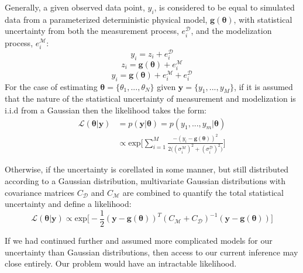 Generally, a given observed data point, $y_i$, is considered to be equal to simulated data from a parameterized deterministic physical model, $\bm{g}(\bm{\theta})$, with statistical uncertainty from both the measurement process, $e^{\mathcal{D}}_i$, and the modelization process, $e^{\mathcal{M}}_i$:
\begin{equation}
y_i = z_i + e^{\mathcal{D}}_i
\end{equation}
\begin{equation}
z_i = \bm{g}(\bm{\theta}) + e^{\mathcal{M}}_i
\end{equation}
\begin{equation}
y_i = \bm{g}(\bm{\theta}) + e^{\mathcal{M}}_i + e^{\mathcal{D}}_i
\end{equation}
For the case of estimating $\bm{\theta} = \{\theta_1,...,\theta_N\}$ given $\bm{y} = \{y_1,...,y_M\}$, if it is assumed that the nature of the statistical uncertainty of measurement and modelization is i.i.d from a Gaussian then the likelihood takes the form: 
\begin{equation}
\begin{split}
\mathcal{L}(\bm{\theta}|\bm{y}) &= p(\bm{y}|\bm{\theta}) = p(y_1,...,y_m|\bm{\theta})\\
&\propto  \text{exp}\bigg[\sum_{i = 1}^{M}\frac{-(y_i-\bm{g}({\bm{\theta}}))^2}{2\big((\sigma^{\mathcal{M}}_i)^2+(\sigma^{\mathcal{D}}_i)^2\big)}\bigg]
\end{split}
\label{likelihood-1}
\end{equation}



Otherwise, if the uncertainty is corellated in some manner, but still distributed according to a Gaussian distribution, multivariate Gaussian distributions with covariance matrices $C_{\mathcal{D}}$ and $C_{\mathcal{M}}$ are combined to quantify the total statistical uncertainty and define a likelihood:
\begin{equation}
\mathcal{L}(\bm{\theta}|\bm{y}) \propto \text{exp}\bigg[-\frac{1}{2}(\bm{y}-\bm{g}(\bm{\theta}))^T(C_{\mathcal{M}}+C_{\mathcal{D}})^{-1}(\bm{y}-\bm{g}(\bm{\theta}))\bigg]
\label{likelihood-2}
\end{equation}

If we had continued further and assumed more complicated models for our uncertainty than Gaussian distributions, then access to our current inference may close entirely. Our problem would have an intractable likelihood.\\

